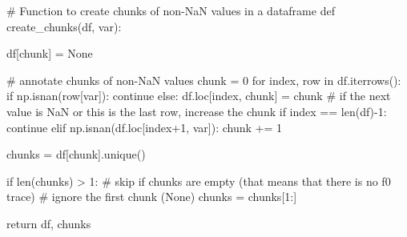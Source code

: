 \documentclass[
  letterpaper,
  DIV=11,
  numbers=noendperiod]{scrreprt}
\newenvironment{Shaded}{\begin{snugshade}}{\end{snugshade}}
\newcommand{\BuiltInTok}[1]{\textcolor[rgb]{0.00,0.23,0.31}{#1}}
\newcommand{\CommentTok}[1]{\textcolor[rgb]{0.37,0.37,0.37}{#1}}
\newcommand{\ControlFlowTok}[1]{\textcolor[rgb]{0.00,0.23,0.31}{#1}}
\newcommand{\DecValTok}[1]{\textcolor[rgb]{0.68,0.00,0.00}{#1}}
\newcommand{\KeywordTok}[1]{\textcolor[rgb]{0.00,0.23,0.31}{#1}}
\newcommand{\NormalTok}[1]{\textcolor[rgb]{0.00,0.23,0.31}{#1}}
\newcommand{\OperatorTok}[1]{\textcolor[rgb]{0.37,0.37,0.37}{#1}}
\newcommand{\StringTok}[1]{\textcolor[rgb]{0.13,0.47,0.30}{#1}}
\newcommand{\VariableTok}[1]{\textcolor[rgb]{0.07,0.07,0.07}{#1}}
\begin{document}
\begin{Shaded}
\begin{Highlighting}[]
\CommentTok{\# Function to create chunks of non{-}NaN values in a dataframe}
\KeywordTok{def}\NormalTok{ create\_chunks(df, var):}

\NormalTok{    df[}\StringTok{\textquotesingle{}chunk\textquotesingle{}}\NormalTok{] }\OperatorTok{=} \VariableTok{None}

    \CommentTok{\# annotate chunks of non{-}NaN values}
\NormalTok{    chunk }\OperatorTok{=} \DecValTok{0}
    \ControlFlowTok{for}\NormalTok{ index, row }\KeywordTok{in}\NormalTok{ df.iterrows():}
        \ControlFlowTok{if}\NormalTok{ np.isnan(row[var]):}
            \ControlFlowTok{continue}
        \ControlFlowTok{else}\NormalTok{:}
\NormalTok{            df.loc[index, }\StringTok{\textquotesingle{}chunk\textquotesingle{}}\NormalTok{] }\OperatorTok{=}\NormalTok{ chunk}
            \CommentTok{\# if the next value is NaN or this is the last row, increase the chunk}
            \ControlFlowTok{if}\NormalTok{ index }\OperatorTok{==} \BuiltInTok{len}\NormalTok{(df)}\OperatorTok{{-}}\DecValTok{1}\NormalTok{:}
                \ControlFlowTok{continue}
            \ControlFlowTok{elif}\NormalTok{ np.isnan(df.loc[index}\OperatorTok{+}\DecValTok{1}\NormalTok{, var]):}
\NormalTok{                chunk }\OperatorTok{+=} \DecValTok{1}

\NormalTok{    chunks }\OperatorTok{=}\NormalTok{ df[}\StringTok{\textquotesingle{}chunk\textquotesingle{}}\NormalTok{].unique()}

    \ControlFlowTok{if} \BuiltInTok{len}\NormalTok{(chunks) }\OperatorTok{\textgreater{}} \DecValTok{1}\NormalTok{: }\CommentTok{\# skip if chunks are empty (that means that there is no f0 trace)}
        \CommentTok{\# ignore the first chunk (None)}
\NormalTok{        chunks }\OperatorTok{=}\NormalTok{ chunks[}\DecValTok{1}\NormalTok{:]}

    \ControlFlowTok{return}\NormalTok{ df, chunks}


\end{Highlighting}
\end{Shaded}
\end{document}
